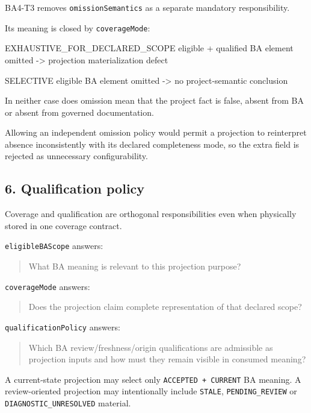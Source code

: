 \documentclass[
  11pt,
  a4paper,
]{article}
\newenvironment{Shaded}{}{}
\newcommand{\NormalTok}[1]{#1}
\begin{document}
BA4-T3 removes \texttt{omissionSemantics} as a separate mandatory
responsibility.

Its meaning is closed by \texttt{coverageMode}:

\begin{Shaded}
\begin{Highlighting}[]
\NormalTok{EXHAUSTIVE\_FOR\_DECLARED\_SCOPE}
\NormalTok{  eligible + qualified BA element omitted}
\NormalTok{      {-}\textgreater{} projection materialization defect}

\NormalTok{SELECTIVE}
\NormalTok{  eligible BA element omitted}
\NormalTok{      {-}\textgreater{} no project{-}semantic conclusion}
\end{Highlighting}
\end{Shaded}

In neither case does omission mean that the project fact is false,
absent from BA or absent from governed documentation.

Allowing an independent omission policy would permit a projection to
reinterpret absence inconsistently with its declared completeness mode,
so the extra field is rejected as unnecessary configurability.

\subsection{6. Qualification policy}\label{qualification-policy}

Coverage and qualification are orthogonal responsibilities even when
physically stored in one coverage contract.

\texttt{eligibleBAScope} answers:

\begin{quote}
What BA meaning is relevant to this projection purpose?
\end{quote}

\texttt{coverageMode} answers:

\begin{quote}
Does the projection claim complete representation of that declared
scope?
\end{quote}

\texttt{qualificationPolicy} answers:

\begin{quote}
Which BA review/freshness/origin qualifications are admissible as
projection inputs and how must they remain visible in consumed meaning?
\end{quote}

A current-state projection may select only \texttt{ACCEPTED\ +\ CURRENT}
BA meaning. A review-oriented projection may intentionally include
\texttt{STALE}, \texttt{PENDING\_REVIEW} or
\texttt{DIAGNOSTIC\_UNRESOLVED} material.
\end{document}
